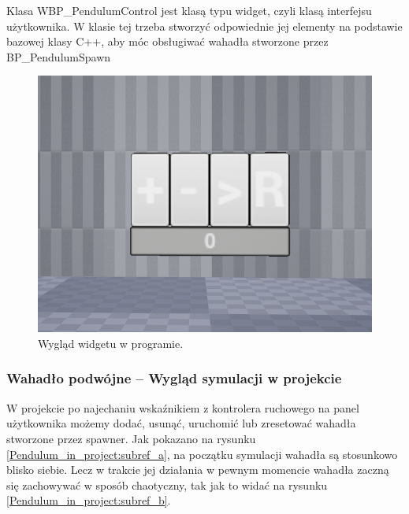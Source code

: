 \documentclass[a4paper,12pt,reqno]{article}
\begin{document}
 
Klasa WBP\_PendulumControl jest klasą typu widget, czyli klasą interfejsu użytkownika. W klasie tej trzeba stworzyć odpowiednie jej elementy na podstawie bazowej klasy C++, aby móc obsługiwać wahadła stworzone przez BP\_PendulumSpawn


\begin{figure}[!ht]%
\centering
\includegraphics[width=0.7\columnwidth]{graphics/pendulum/PendulumControlBP.png}
\caption{Wygląd widgetu w programie.
\label{BPExample}}%
%
\qquad
\end{figure}  

\newpage
\subsubsection{Wahadło podwójne – Wygląd symulacji w projekcie}

W projekcie po najechaniu wskaźnikiem z kontrolera ruchowego na panel użytkownika możemy dodać, usunąć, uruchomić lub zresetować wahadła stworzone przez spawner. Jak pokazano na rysunku \ref{Pendulum_in_project:subref_a}, na początku symulacji wahadła są stosunkowo blisko siebie. Lecz w trakcie jej działania w pewnym momencie wahadła zaczną się zachowywać w sposób chaotyczny, tak jak to widać na rysunku \ref{Pendulum_in_project:subref_b}.
\end{document}
